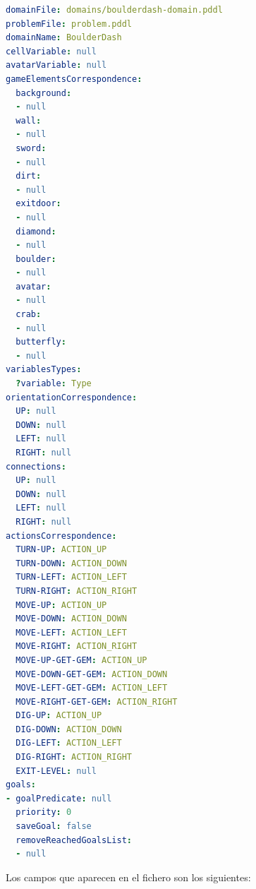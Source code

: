 \begin{lstlisting}[language=yaml]
domainFile: domains/boulderdash-domain.pddl
problemFile: problem.pddl
domainName: BoulderDash
cellVariable: null
avatarVariable: null
gameElementsCorrespondence:
  background:
  - null
  wall:
  - null
  sword:
  - null
  dirt:
  - null
  exitdoor:
  - null
  diamond:
  - null
  boulder:
  - null
  avatar:
  - null
  crab:
  - null
  butterfly:
  - null
variablesTypes:
  ?variable: Type
orientationCorrespondence:
  UP: null
  DOWN: null
  LEFT: null
  RIGHT: null
connections:
  UP: null
  DOWN: null
  LEFT: null
  RIGHT: null
actionsCorrespondence:
  TURN-UP: ACTION_UP
  TURN-DOWN: ACTION_DOWN
  TURN-LEFT: ACTION_LEFT
  TURN-RIGHT: ACTION_RIGHT
  MOVE-UP: ACTION_UP
  MOVE-DOWN: ACTION_DOWN
  MOVE-LEFT: ACTION_LEFT
  MOVE-RIGHT: ACTION_RIGHT
  MOVE-UP-GET-GEM: ACTION_UP
  MOVE-DOWN-GET-GEM: ACTION_DOWN
  MOVE-LEFT-GET-GEM: ACTION_LEFT
  MOVE-RIGHT-GET-GEM: ACTION_RIGHT
  DIG-UP: ACTION_UP
  DIG-DOWN: ACTION_DOWN
  DIG-LEFT: ACTION_LEFT
  DIG-RIGHT: ACTION_RIGHT
  EXIT-LEVEL: null
goals:
- goalPredicate: null
  priority: 0
  saveGoal: false
  removeReachedGoalsList:
  - null
\end{lstlisting}

Los campos que aparecen en el fichero son los siguientes:

